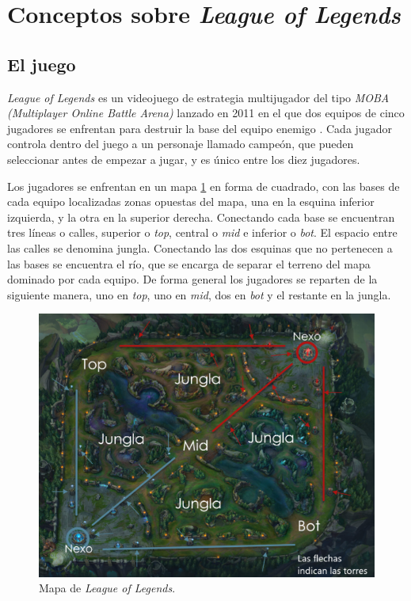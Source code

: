 
\section{Conceptos sobre \textit{League of Legends}}

\subsection{El juego}
\textit{League of Legends} es un videojuego de estrategia multijugador del tipo \textit{MOBA (Multiplayer Online Battle Arena)} lanzado en 2011 en el que dos equipos de cinco jugadores se enfrentan para destruir la base del equipo enemigo \cite{misc:como-jugar}. Cada jugador controla dentro del juego a un personaje llamado campeón, que pueden seleccionar antes de empezar a jugar, y es único entre los diez jugadores.

Los jugadores se enfrentan en un mapa \ref{fig:mapa-lol} en forma de cuadrado, con las bases de cada equipo localizadas zonas opuestas del mapa, una en la esquina inferior izquierda, y la otra en la superior derecha. Conectando cada base se encuentran tres líneas o calles, superior o \textit{top}, central o \textit{mid} e inferior o \textit{bot}. El espacio entre las calles se denomina jungla. Conectando las dos esquinas que no pertenecen a las bases se encuentra el río, que se encarga de separar el terreno del mapa dominado por cada equipo. De forma general los jugadores se reparten de la siguiente manera, uno en \textit{top}, uno en \textit{mid}, dos en \textit{bot} y el restante en la jungla.

\begin{figure}
	\centering
	\includegraphics[width=1\linewidth]{img/mapa-lol}
	\caption{Mapa de \textit{League of Legends}.}
	\label{fig:mapa-lol}
\end{figure}

